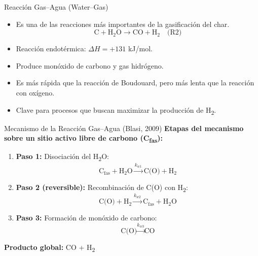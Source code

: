 \documentclass[../../main.tex]{subfiles}
\begin{document}
\begin{frame}{Reacción Gas–Agua (Water–Gas)}
\small
\begin{itemize}
  \item Es una de las reacciones más importantes de la gasificación del char.
  \[
  \text{C} + \text{H}_2\text{O} \rightarrow \text{CO} + \text{H}_2 \quad \text{(R2)}
  \]
  \item Reacción endotérmica: $\Delta H = +131$ kJ/mol.
  \item Produce monóxido de carbono y gas hidrógeno.
  \item Es más rápida que la reacción de Boudouard, pero más lenta que la reacción con oxígeno.
  \item Clave para procesos que buscan maximizar la producción de H\textsubscript{2}.
\end{itemize}
\end{frame}

\begin{frame}{Mecanismo de la Reacción Gas–Agua (Blasi, 2009)}
\small
\textbf{Etapas del mecanismo sobre un sitio activo libre de carbono (C\textsubscript{fas}):}

\vspace{0.5em}
\begin{enumerate}
  \item \textbf{Paso 1:} Disociación del H\textsubscript{2}O:
  \[
  \text{C}_{\text{fas}} + \text{H}_2\text{O} \xrightarrow{k_{w1}} \text{C(O)} + \text{H}_2
  \]
  \item \textbf{Paso 2 (reversible):} Recombinación de C(O) con H\textsubscript{2}:
  \[
  \text{C(O)} + \text{H}_2 \xrightarrow{k_{w2}} \text{C}_{\text{fas}} + \text{H}_2\text{O}
  \]
  \item \textbf{Paso 3:} Formación de monóxido de carbono:
  \[
  \text{C(O)} \xrightarrow{k_{w3}} \text{CO}
  \]
\end{enumerate}

\vspace{0.5em}
\textbf{Producto global:} CO + H\textsubscript{2}
\end{frame}
\end{document}
